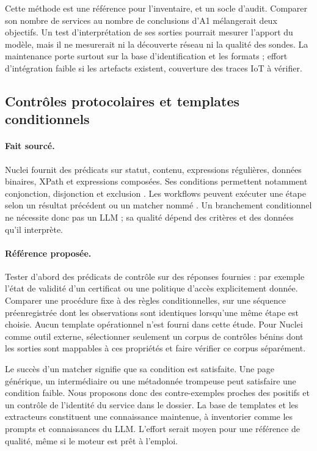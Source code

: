 \documentclass[11pt,a4paper]{article}
\begin{document}
Cette méthode est une référence pour l'inventaire, et un socle d'audit. Comparer son nombre de services au nombre de conclusions d'A1 mélangerait deux objectifs. Un test d'interprétation de ses sorties pourrait mesurer l'apport du modèle, mais il ne mesurerait ni la découverte réseau ni la qualité des sondes. La maintenance porte surtout sur la base d'identification et les formats ; effort d'intégration faible si les artefacts existent, couverture des traces IoT à vérifier.

\subsection{Contrôles protocolaires et templates conditionnels}
\paragraph{Fait sourcé.}
Nuclei fournit des prédicats sur statut, contenu, expressions régulières, données binaires, XPath et expressions composées. Ses conditions permettent notamment conjonction, disjonction et exclusion \cite{nuclei-matchers}. Les workflows peuvent exécuter une étape selon un résultat précédent ou un matcher nommé \cite{nuclei-workflows}. Un branchement conditionnel ne nécessite donc pas un LLM ; sa qualité dépend des critères et des données qu'il interprète.

\paragraph{Référence proposée.}
Tester d'abord des prédicats de contrôle sur des réponses fournies : par exemple l'état de validité d'un certificat ou une politique d'accès explicitement donnée. Comparer une procédure fixe à des règles conditionnelles, sur une séquence préenregistrée dont les observations sont identiques lorsqu'une même étape est choisie. Aucun template opérationnel n'est fourni dans cette étude. Pour Nuclei comme outil externe, sélectionner seulement un corpus de contrôles bénins dont les sorties sont mappables à ces propriétés et faire vérifier ce corpus séparément.

Le succès d'un matcher signifie que sa condition est satisfaite. Une page générique, un intermédiaire ou une métadonnée trompeuse peut satisfaire une condition faible. Nous proposons donc des contre-exemples proches des positifs et un contrôle de l'identité du service dans le dossier. La base de templates et les extracteurs constituent une connaissance maintenue, à inventorier comme les prompts et connaissances du LLM. L'effort serait moyen pour une référence de qualité, même si le moteur est prêt à l'emploi.
\end{document}
